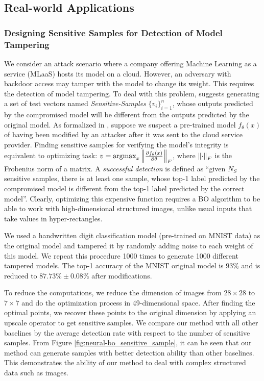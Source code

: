 \subsection{Real-world Applications}
\subsubsection{Designing Sensitive Samples for Detection of Model Tampering}
\label{section:neural-bo_sensitive_samples}


We consider an attack scenario where a company offering Machine Learning as a service (MLaaS) hosts its model on a cloud. However, an adversary with backdoor access may tamper with the model to change its weight. This requires the detection of model tampering. To deal with this problem, \citet{he2018verideep} suggests generating a set of test vectors named \emph{Sensitive-Samples} $\{v_i\}_{i=1}^n$, whose outputs predicted by the compromised model will be different from the outputs predicted by the original model. As formalized in \citet{he2018verideep}, suppose we suspect a pre-trained model $f_\theta(x)$ of having been modified by an attacker after it was sent to the cloud service provider. Finding sensitive samples for verifying the model's integrity is equivalent to optimizing task: $v = \operatorname*{argmax}_x \norm{\frac{\partial f_\theta(x)}{\partial \theta}}_F$, where $\norm{\cdot}_F$ is the Frobenius norm of a matrix. A \emph{successful detection} is defined as ``given $N_S$ sensitive samples, there is at least one sample, whose top-1 label predicted by the compromised model is different from the top-1 label predicted by the correct model''. Clearly, optimizing this expensive function requires a BO algorithm to be able to work with high-dimensional structured images, unlike usual inputs that take values in hyper-rectangles.

We used a handwritten digit classification model (pre-trained on MNIST data) as the original model and tampered it by randomly adding noise to each weight of this model. We repeat this procedure 1000 times to generate 1000 different tampered models. The top-1 accuracy of the MNIST original model is $93\%$ and is reduced to $87.73\% \pm 0.08\%$ after modifications.   

To reduce the computations, we reduce the dimension of images from $28 \times 28$ to $7 \times 7$ and do the optimization process in 49-dimensional space. After finding the optimal points, we recover these points to the original dimension by applying an upscale operator to get sensitive samples. We compare our method with all other baselines by the average detection rate with respect to the number of sensitive samples. From Figure \ref{fig:neural-bo_sensitive_sample}, it can be seen that our method can generate  samples with better detection ability than other baselines. This demonstrates the ability of  our method to deal with complex structured data such as images. 

